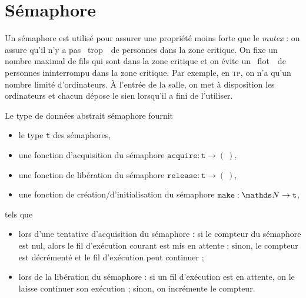 \section{Sémaphore}

Un sémaphore est utilisé pour assurer une propriété moins forte que le \textit{mutex} : on assure qu'il n'y a pas \guillemotleft~trop~\guillemotright\ de personnes dans la zone critique.
On fixe un nombre maximal de fils qui sont dans la zone critique et on évite un \guillemotleft~flot~\guillemotright\ de personnes ininterrompu dans la zone critique.
Par exemple, en \textsc{tp}, on n'a qu'un nombre limité d'ordinateurs. À l'entrée de la salle, on met à disposition les ordinateurs et chacun dépose le sien lorsqu'il a fini de l'utiliser.

\begin{defn}
	Le type de données abstrait \textsf{sémaphore} fournit
	\begin{itemize}
		\item le type \texttt{t} des sémaphores,
		\item une fonction d'acquisition du sémaphore $\texttt{acquire} : \texttt{t} \to (\:)$,
		\item une fonction de libération du sémaphore $\texttt{release} : \texttt{t} \to (\:)$,
		\item une fonction de création/d'initialisation du sémaphore $\texttt{make} : \N\to \texttt{t}$,
	\end{itemize}
	tels que
	\begin{itemize}
		\item lors d'une tentative d'acquisition du sémaphore : si le compteur du sémaphore est nul, alors le fil d'exécution courant est mis en attente ; sinon, le compteur est décrémenté et le fil d'exécution peut continuer ;
		\item lors de la libération du sémaphore : si un fil d'exécution est en attente, on le laisse continuer son exécution ; sinon, on incrémente le compteur.
	\end{itemize}
\end{defn}


